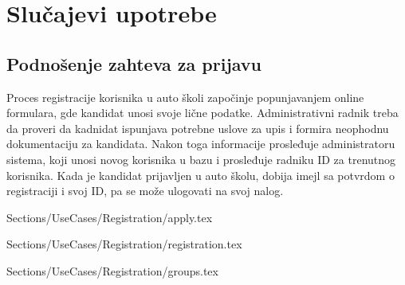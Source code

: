 \section{Slučajevi upotrebe}
\label{subsec:podnaslov2}
\subsection {Podnošenje zahteva za prijavu}
Proces registracije korisnika u auto školi započinje popunjavanjem online formulara, gde kandidat unosi svoje lične podatke. Administrativni radnik treba da proveri da kadnidat ispunjava potrebne uslove za upis i formira neophodnu dokumentaciju za kandidata. Nakon toga informacije prosleđuje administratoru sistema, koji unosi novog korisnika u bazu i prosleđuje radniku ID za trenutnog korisnika. Kada je kandidat prijavljen u auto školu, dobija imejl sa potvrdom o registraciji i svoj ID, pa se može ulogovati na svoj nalog. 

 {Sections/UseCases/Registration/apply.tex}

 {Sections/UseCases/Registration/registration.tex}

 {Sections/UseCases/Registration/groups.tex}